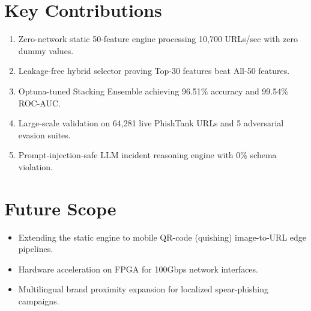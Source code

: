 \documentclass[12pt,a4paper,oneside]{report}
\begin{document}
\section{Key Contributions}
\begin{enumerate}
    \item Zero-network static 50-feature engine processing 10,700 URLs/sec with zero dummy values.
    \item Leakage-free hybrid selector proving Top-30 features beat All-50 features.
    \item Optuna-tuned Stacking Ensemble achieving 96.51\% accuracy and 99.54\% ROC-AUC.
    \item Large-scale validation on 64,281 live PhishTank URLs and 5 adversarial evasion suites.
    \item Prompt-injection-safe LLM incident reasoning engine with 0\% schema violation.
\end{enumerate}

\section{Future Scope}
\begin{itemize}
    \item Extending the static engine to mobile QR-code (quishing) image-to-URL edge pipelines.
    \item Hardware acceleration on FPGA for 100Gbps network interfaces.
    \item Multilingual brand proximity expansion for localized spear-phishing campaigns.
\end{itemize}
\end{document}
